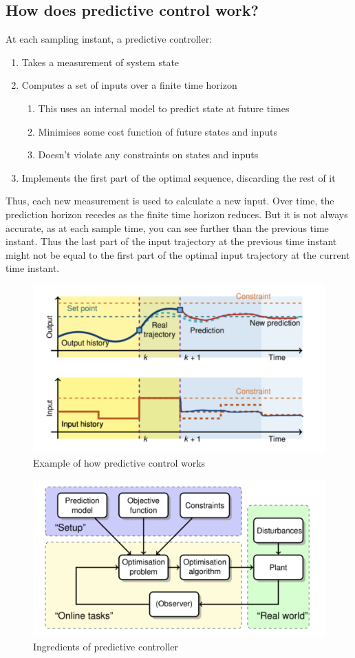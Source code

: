 \documentclass{article}
\begin{document}
\subsection{How does predictive control work?}
At each sampling instant, a predictive controller:
\begin{enumerate}
    \item Takes a measurement of system state
    \item Computes a set of inputs over a finite time horizon
    \begin{enumerate}
        \item This uses an internal model to predict state at future times
        \item Minimises some cost function of future states and inputs
        \item Doesn't violate any constraints on states and inputs
    \end{enumerate}
    \item Implements the first part of the optimal sequence, discarding the rest of it
\end{enumerate}
Thus, each new measurement is used to calculate a new input. Over time, the prediction horizon recedes as the finite time horizon reduces. But it is not always accurate, as at each sample time, you can see further than the previous time instant. Thus the last part of the input trajectory at the previous time instant might not be equal to the first part of the optimal input trajectory at the current time instant.
\begin{figure}[H]
    \centering
    \includegraphics[width=0.6\linewidth]{Screenshot 2023-02-17 at 12.38.38.png}
    \caption{Example of how predictive control works}
\end{figure}
\begin{figure}[H]
    \centering
    \includegraphics[width=0.6\linewidth]{Screenshot 2023-02-17 at 12.36.54.png}
    \caption{Ingredients of predictive controller}
\end{figure}
\end{document}
